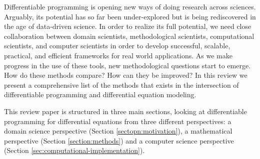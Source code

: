 Differentiable programming is opening new ways of doing research across sciences. 
Arguably, its potential has so far been under-explored but is being rediscovered in the age of data-driven science. 
In order to realize its full potential, we need close collaboration between domain scientists, methodological scientists, computational scientists, and computer scientists in order to develop successful, scalable, practical, and efficient frameworks for real world applications.
As we make progress in the use of these tools, new methodological questions start to emerge. 
How do these methods compare? How can they be improved? 
In this review we present a comprehensive list of the methods that exists in the intersection of differentiable programming and differential equation modeling. 

This review paper is structured in three main sections, looking at differentiable programming for differential equations from three different perspectives: a domain science perspective (Section \ref{sectopn:motivation}), a mathematical perspective (Section \ref{section:methods}) and a computer science perspective (Section \ref{sec:computational-implementation}). 